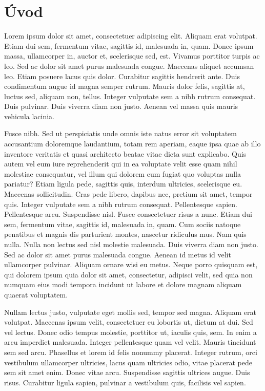 \documentclass[czech,master,dept460,male,cpp,cpdeclaration]{diploma}
\begin{document}
\MakeTitlePages
\section{Úvod}
\label{sec:Introduction}
Lorem ipsum dolor sit amet, consectetuer adipiscing elit. Aliquam erat volutpat. Etiam dui sem, fermentum vitae, sagittis id, malesuada in, quam. Donec ipsum massa, ullamcorper in, auctor et, scelerisque sed, est. Vivamus porttitor turpis ac leo. Sed ac dolor sit amet purus malesuada congue. Maecenas aliquet accumsan leo. Etiam posuere lacus quis dolor. Curabitur sagittis hendrerit ante. Duis condimentum augue id magna semper rutrum. Mauris dolor felis, sagittis at, luctus sed, aliquam non, tellus. Integer vulputate sem a nibh rutrum consequat. Duis pulvinar. Duis viverra diam non justo. Aenean vel massa quis mauris vehicula lacinia.

Fusce nibh. Sed ut perspiciatis unde omnis iste natus error sit voluptatem accusantium doloremque laudantium, totam rem aperiam, eaque ipsa quae ab illo inventore veritatis et quasi architecto beatae vitae dicta sunt explicabo. Quis autem vel eum iure reprehenderit qui in ea voluptate velit esse quam nihil molestiae consequatur, vel illum qui dolorem eum fugiat quo voluptas nulla pariatur? Etiam ligula pede, sagittis quis, interdum ultricies, scelerisque eu. Maecenas sollicitudin. Cras pede libero, dapibus nec, pretium sit amet, tempor quis. Integer vulputate sem a nibh rutrum consequat. Pellentesque sapien. Pellentesque arcu. Suspendisse nisl. Fusce consectetuer risus a nunc. Etiam dui sem, fermentum vitae, sagittis id, malesuada in, quam. Cum sociis natoque penatibus et magnis dis parturient montes, nascetur ridiculus mus. Nam quis nulla. Nulla non lectus sed nisl molestie malesuada. Duis viverra diam non justo. Sed ac dolor sit amet purus malesuada congue. Aenean id metus id velit ullamcorper pulvinar. Aliquam ornare wisi eu metus. Neque porro quisquam est, qui dolorem ipsum quia dolor sit amet, consectetur, adipisci velit, sed quia non numquam eius modi tempora incidunt ut labore et dolore magnam aliquam quaerat voluptatem.

Nullam lectus justo, vulputate eget mollis sed, tempor sed magna. Aliquam erat volutpat. Maecenas ipsum velit, consectetuer eu lobortis ut, dictum at dui. Sed vel lectus. Donec odio tempus molestie, porttitor ut, iaculis quis, sem. In enim a arcu imperdiet malesuada. Integer pellentesque quam vel velit. Mauris tincidunt sem sed arcu. Phasellus et lorem id felis nonummy placerat. Integer rutrum, orci vestibulum ullamcorper ultricies, lacus quam ultricies odio, vitae placerat pede sem sit amet enim. Donec vitae arcu. Suspendisse sagittis ultrices augue. Duis risus. Curabitur ligula sapien, pulvinar a vestibulum quis, facilisis vel sapien.
\end{document}

